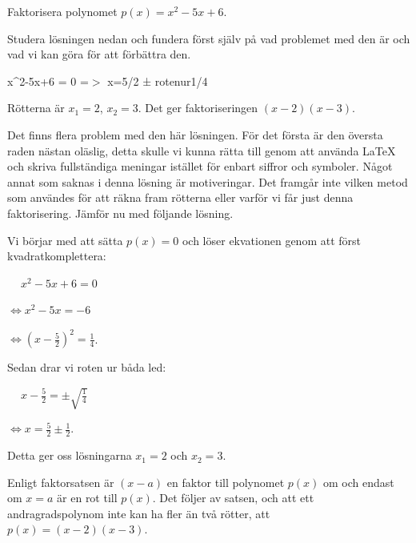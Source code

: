 \documentclass[titlepage]{article}
\begin{document}
\begin{center}
\begin{tcolorbox}[width=\linewidth,colback={white},title={\textbf{Problem}},outer arc=0mm,colupper=black]
    Faktorisera polynomet $p(x)=x^2-5x+6$.
\end{tcolorbox} 
\end{center}

Studera lösningen nedan och fundera först själv på vad problemet med den är och vad vi kan göra för att förbättra den.

\begin{center}
\begin{tcolorbox}[width=\linewidth,colback={red!15!white},title={\textbf{Lösning 1 - Sämre}},outer arc=0mm,colupper=black]
    x\textasciicircum2-5x+6 = 0 =$>$ x=5/2 ± rotenur1/4

    Rötterna är $x_1 = 2$, $x_2 = 3$. Det ger faktoriseringen $(x-2)(x-3)$.
\end{tcolorbox} 
\end{center}

Det finns flera problem med den här lösningen. För det första är den översta raden nästan oläslig, detta skulle vi kunna rätta till genom att använda \LaTeX$\:$ och skriva fullständiga meningar istället för enbart siffror och symboler. Något annat som saknas i denna lösning är motiveringar. Det framgår inte vilken metod som användes för att räkna fram rötterna eller varför vi får just denna faktorisering. Jämför nu med följande lösning.

\begin{center}
\begin{tcolorbox}[width=\linewidth,colback={green!25!white},title={\textbf{Lösning 2 - Bättre}},outer arc=0mm,colupper=black]    
    Vi börjar med att sätta $p(x)=0$ och löser ekvationen genom att först kvadratkomplettera:
    \vspace{2mm}

    $\quad \: x^2-5x+6 = 0$

    $\Leftrightarrow x^2-5x = -6$

    $\Leftrightarrow(x-\frac{5}{2})^2 = \frac{1}{4}$.
    \vspace{2mm}

    Sedan drar vi roten ur båda led:
    \vspace{2mm}

    $\quad \: x-\frac{5}{2} = \pm \sqrt{\frac{1}{4}}$

    $\Leftrightarrow x = \frac{5}{2} \pm \frac{1}{2}$.
    \vspace{2mm}

    Detta ger oss lösningarna $x_1 = 2$ och $x_2=3$.

    Enligt faktorsatsen är $(x-a)$ en faktor till polynomet $p(x)$ om och endast om $x = a$ är en rot till $p(x)$. Det följer av satsen, och att ett andragradspolynom inte kan ha fler än två rötter, att $p(x) = (x-2)(x-3)$.
\end{tcolorbox} 
\end{center}
\end{document}
